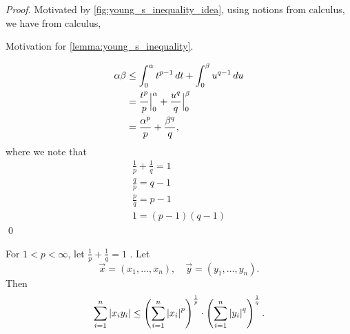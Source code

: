 \documentclass[notoc,notitlepage]{tufte-book}
\begin{document}
\begin{proof}
  Motivated by \cref{fig:young_s_inequality_idea}, using notions from calculus, we have from calculus,
  \begin{marginfigure}
    \caption{Motivation for \cref{lemma:young_s_inequality}.}
    \label{fig:young_s_inequality_idea}
  \end{marginfigure}
  \begin{align*}
    \alpha \beta &\leq \int_{0}^{\alpha} t^{p - 1} \mathop{}\!d{t} + \int_{0}^{\beta} u^{q - 1} \mathop{}\!d{u} \\
                 &= \frac{t^p}{p} \Big|_{0}^{\alpha} + \frac{u^q}{q} \Big|_{0}^{\beta} \\
                 &= \frac{\alpha^p}{p} + \frac{\beta^q}{q},
  \end{align*}
  where we note that
  \begin{gather*}
    \frac{1}{p} + \frac{1}{q} = 1 \\
    \frac{q}{p} = q - 1 \\
    \frac{p}{q} = p - 1 \\
    1 = (p - 1)(q - 1)
  \end{gather*}\qed
\end{proof}

\begin{thm}\label{thm:holder_s_inequality}
  For $1 < p < \infty$, let $\frac{1}{p} + \frac{1}{q} = 1$ . Let
  \begin{equation*}
    \vec{x} = ( x_1, \ldots, x_n ), \quad \vec{y} = ( y_1, \ldots, y_n ).
  \end{equation*}
  Then
  \begin{equation*}
    \sum_{i=1}^{n}  \left| x_i y_i \right| \leq \left( \sum_{i=1}^{n} \left|x_i\right|^p \right)^{\frac{1}{p}} \cdot \left( \sum_{i=1}^{n} \left|y_i\right|^q \right)^{\frac{1}{q}}.
  \end{equation*}
\end{thm}
\end{document}
